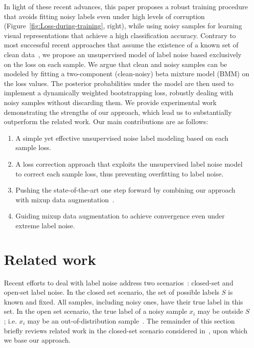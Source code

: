\documentclass{article}
\begin{document}
In light of these recent advances, this paper proposes a robust training
procedure that avoids fitting noisy labels even under high levels
of corruption (Figure~\ref{fig:Loss-during-training}, right), while
using noisy samples for learning visual representations that achieve
a high classification accuracy. Contrary to most successful recent
approaches that assume the existence of a known set of clean data~\cite{2018_ICML_L2ReweightNoise,2018_NIPS_GoldLoss},
we propose an unsupervised model of label noise based exclusively
on the loss on each sample. We argue that clean and noisy samples
can be modeled by fitting a two-component (clean-noisy) beta mixture
model (BMM) on the loss values. The posterior probabilities under
the model are then used to implement a dynamically weighted bootstrapping
loss, robustly dealing with noisy samples without discarding them.
We provide experimental work demonstrating the strengths
of our approach, which lead us to substantially outperform the related
work. Our main contributions are as follows: 
\begin{enumerate}
\item A simple yet effective unsupervised noise label modeling based on
each sample loss. 
\item A loss correction approach that exploits the unsupervised label noise
model to correct each sample loss, thus preventing overfitting to
label noise. 
\item Pushing the state-of-the-art one step forward by combining our approach
with mixup data augmentation~\cite{2018_ICLR_mixup}.
\item Guiding mixup data augmentation to achieve convergence even under
extreme label noise.
\end{enumerate}

\section{Related work}

Recent efforts to deal with label noise address two scenarios~\cite{2018_CVPR_IterativeNoise}:
closed-set and open-set label noise. In the closed set scenario, the
set of possible labels $S$ is known and fixed. All samples, including
noisy ones, have their true label in this set. In the open set scenario,
the true label of a noisy sample $x_{i}$ may be outside $S$; i.e.
$x_{i}$ may be an out-of-distribution sample~\cite{2018_ICLR_OutOfDist}.
The remainder of this section briefly reviews related work in the
closed-set scenario considered in~\cite{2017_ICLR_Rethinking}, upon
which we base our approach.
\end{document}
